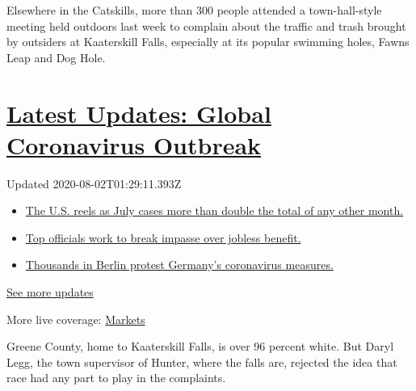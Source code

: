 Elsewhere in the Catskills, more than 300 people attended a
town-hall-style meeting held outdoors last week to complain about the
traffic and trash brought by outsiders at Kaaterskill Falls, especially
at its popular swimming holes, Fawns Leap and Dog Hole.

\hypertarget{latest-updates-global-coronavirus-outbreak}{%
\section{\texorpdfstring{\href{https://www.nytimes.com/2020/08/01/world/coronavirus-covid-19.html?action=click\&pgtype=Article\&state=default\&region=MAIN_CONTENT_1\&context=storylines_live_updates}{Latest
Updates: Global Coronavirus
Outbreak}}{Latest Updates: Global Coronavirus Outbreak}}\label{latest-updates-global-coronavirus-outbreak}}

Updated 2020-08-02T01:29:11.393Z

\begin{itemize}
\tightlist
\item
  \href{https://www.nytimes.com/2020/08/01/world/coronavirus-covid-19.html?action=click\&pgtype=Article\&state=default\&region=MAIN_CONTENT_1\&context=storylines_live_updates\#link-34047410}{The
  U.S. reels as July cases more than double the total of any other
  month.}
\item
  \href{https://www.nytimes.com/2020/08/01/world/coronavirus-covid-19.html?action=click\&pgtype=Article\&state=default\&region=MAIN_CONTENT_1\&context=storylines_live_updates\#link-3ac56579}{Top
  officials work to break impasse over jobless benefit.}
\item
  \href{https://www.nytimes.com/2020/08/01/world/coronavirus-covid-19.html?action=click\&pgtype=Article\&state=default\&region=MAIN_CONTENT_1\&context=storylines_live_updates\#link-25930521}{Thousands
  in Berlin protest Germany's coronavirus measures.}
\end{itemize}

\href{https://www.nytimes.com/2020/08/01/world/coronavirus-covid-19.html?action=click\&pgtype=Article\&state=default\&region=MAIN_CONTENT_1\&context=storylines_live_updates}{See
more updates}

More live coverage:
\href{https://www.nytimes.com/live/2020/07/31/business/stock-market-today-coronavirus?action=click\&pgtype=Article\&state=default\&region=MAIN_CONTENT_1\&context=storylines_live_updates}{Markets}

Greene County, home to Kaaterskill Falls, is over 96 percent white. But
Daryl Legg, the town supervisor of Hunter, where the falls are, rejected
the idea that race had any part to play in the complaints.

